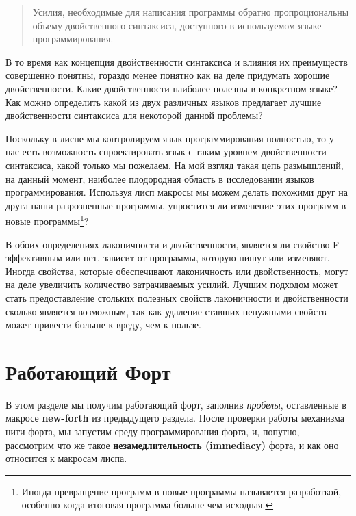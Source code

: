 \begin{quote}
Усилия, необходимые для написания программы обратно пропроциональны объему двойственного синтаксиса, доступного в используемом языке программирования.
\end{quote}

В то время как концепция двойственности синтаксиса и влияния их преимуществ совершенно понятны, гораздо менее понятно как на деле придумать хорошие двойственности. Какие двойственности наиболее полезны в конкретном языке? Как можно определить какой из двух различных языков предлагает лучшие двойственности синтаксиса для некоторой данной проблемы?

Поскольку в лиспе мы контролируем язык программирования полностью, то у нас есть возможность спроектировать язык с таким уровнем двойственности синтаксиса, какой только мы пожелаем. На мой взгляд такая цепь размышлений, на данный момент, наиболее плодородная область в исследовании языков программирования. Используя лисп макросы мы можем делать похожими друг на друга наши разрозненные программы, упростится ли изменение этих программ в новые программы\footnote{Иногда превращение программ в новые программы называется разработкой, особенно когда итоговая программа больше чем исходная.}?

В обоих определениях лаконичности и двойственности, является ли свойство F эффективным или нет, зависит от программы, которую пишут или изменяют. Иногда свойства, которые обеспечивают лаконичность или двойственность, могут на деле увеличить количество затрачиваемых усилий. Лучшим подходом может стать предоставление стольких полезных свойств лаконичности и двойственности сколько является возможным, так как удаление ставших ненужными свойств может привести больше к вреду, чем к пользе.

\section{Работающий Форт}\label{section_going_forth}

В этом разделе мы получим работающий форт, заполнив \emph{пробелы}, оставленные в макросе \textbf{new-forth} из предыдущего раздела. После проверки работы механизма нити форта, мы запустим среду программирования форта, и, попутно, рассмотрим что же такое \textbf{незамедлительность (immediacy)} форта, и как оно относится к макросам лиспа.


